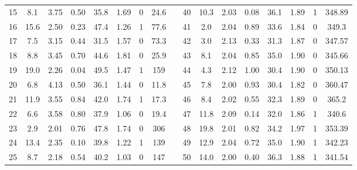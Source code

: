 \documentclass[]{interact}
\theoremstyle{plain}%
\theoremstyle{definition}
\theoremstyle{remark}
\begin{document}
\begin{table}[h!]
{\begin{tabular}{c cccccc c c cccccc cc}
			15 &  8.1 & 3.75 & 0.50 & 35.8 & 1.69 & 0 & 24.6   & & 40 & 10.3 & 2.03 & 0.08 & 36.1 & 1.89 & 1 & 348.89 \\
			16 & 15.6 & 2.50 & 0.23 & 47.4 & 1.26 & 1 & 77.6   & & 41 &  2.0 & 2.04 & 0.89 & 33.6 & 1.84 & 0 & 349.3  \\
			17 &  7.5 & 3.15 & 0.44 & 31.5 & 1.57 & 0 & 73.3   & & 42 &  3.0 & 2.13 & 0.33 & 31.3 & 1.87 & 0 & 347.57 \\
			18 &  8.8 & 3.45 & 0.70 & 44.6 & 1.81 & 0 & 25.9   & & 43 &  8.1 & 2.04 & 0.85 & 35.0 & 1.90 & 0 & 345.66 \\
			19 & 19.0 & 2.26 & 0.04 & 49.5 & 1.47 & 1 & 159    & & 44 &  4.3 & 2.12 & 1.00 & 30.4 & 1.90 & 0 & 350.13 \\
			20 &  6.8 & 4.13 & 0.50 & 36.1 & 1.44 & 0 & 11.8   & & 45 &  7.8 & 2.00 & 0.93 & 30.4 & 1.82 & 0 & 360.47 \\
			21 & 11.9 & 3.55 & 0.84 & 42.0 & 1.74 & 1 & 17.3   & & 46 &  8.4 & 2.02 & 0.55 & 32.3 & 1.89 & 0 & 365.2  \\
			22 &  6.6 & 3.58 & 0.80 & 37.9 & 1.06 & 0 & 19.4   & & 47 & 11.8 & 2.09 & 0.14 & 32.0 & 1.86 & 1 & 340.6  \\
			23 &  2.9 & 2.01 & 0.76 & 47.8 & 1.74 & 0 & 306    & & 48 & 19.8 & 2.01 & 0.82 & 34.2 & 1.97 & 1 & 353.39 \\
			24 & 13.4 & 2.35 & 0.10 & 39.8 & 1.22 & 1 & 139    & & 49 & 12.9 & 2.04 & 0.72 & 35.0 & 1.90 & 1 & 342.23 \\
			25 &  8.7 & 2.18 & 0.54 & 40.2 & 1.03 & 0 & 147    & & 50 & 14.0 & 2.00 & 0.40 & 36.3 & 1.88 & 1 & 341.54 \\
			\bottomrule
		\end{tabular}}
\end{table}
\end{document}
